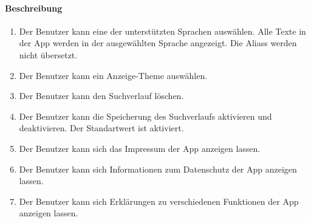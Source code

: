 \paragraph{Beschreibung}
\begin{enumerate}[start=51, label=\textbf{/FA\arabic*/}, align=left]
    \item Der \Gls{Benutzer} kann eine der unterstützten Sprachen auswählen. Alle Texte in der App werden in der ausgewählten Sprache angezeigt. Die \Glspl{Alias} werden nicht übersetzt.
    \item Der \Gls{Benutzer} kann ein Anzeige-\Gls{Theme} auswählen.
    \item Der \Gls{Benutzer} kann den \Gls{Suchverlauf} löschen.
    \item Der \Gls{Benutzer} kann die Speicherung des \Gls{Suchverlauf}s aktivieren und deaktivieren. Der Standartwert ist \dq aktiviert\dq{}.
    \item Der \Gls{Benutzer} kann sich das Impressum der App anzeigen lassen.
    \item Der \Gls{Benutzer} kann sich Informationen zum Datenschutz der App anzeigen lassen.
    \item Der \Gls{Benutzer} kann sich Erklärungen zu verschiedenen Funktionen der App anzeigen lassen.
\end{enumerate}